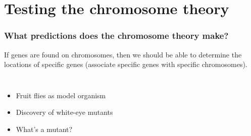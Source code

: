 \begin{frame}[plain]
\end{frame}


\section{Testing the chromosome theory}

\begin{frame}
    \frametitle{What predictions does the chromosome theory make?}
    \begin{adjustwidth}{-2em}{-2em}
    If genes are found on chromosomes, then we should be able to determine the
    locations of specific genes (associate specific genes with specific
    chromosomes).

    \begin{columns}
        
        \begin{itemize}
            \item<2-> Fruit flies as model organism
            \item<3-> Discovery of white-eye mutants
            \item<4-> What's a mutant? 
        \end{itemize}


    \end{columns}
    \end{adjustwidth}

\end{frame}


